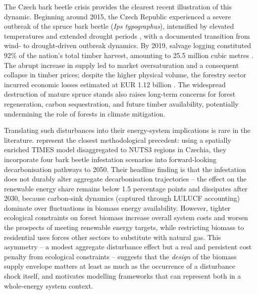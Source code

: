 \documentclass{article}
\begin{document}
The Czech bark beetle crisis provides the clearest recent illustration of this dynamic. Beginning around 2015, the Czech Republic experienced a severe outbreak of the spruce bark beetle (\emph{Ips typographus}), intensified by elevated temperatures and extended drought periods \citep{hlasnyDevastatingOutbreakBark2021}, with a documented transition from wind- to drought-driven outbreak dynamics. By 2019, salvage logging constituted 92\% of the nation's total timber harvest, amounting to 25.5 million cubic metres \citep{simunekNorwaySpruceForest2024}. The abrupt increase in supply led to market oversaturation and a consequent collapse in timber prices; despite the higher physical volume, the forestry sector incurred economic losses estimated at EUR 1.12 billion \citep{tothImpactsCalamityLogging2020}. The widespread destruction of mature spruce stands also raises long-term concerns for forest regeneration, carbon sequestration, and future timber availability, potentially undermining the role of forests in climate mitigation.

Translating such disturbances into their energy-system implications is rare in the literature. \citet{reckaRoleBiomassDecarbonisation2023} represent the closest methodological precedent: using a spatially enriched TIMES model disaggregated to NUTS3 regions in Czechia, they incorporate four bark beetle infestation scenarios into forward-looking decarbonisation pathways to 2050. Their headline finding is that the infestation does not durably alter aggregate decarbonisation trajectories -- the effect on the renewable energy share remains below 1.5 percentage points and dissipates after 2030, because carbon-sink dynamics (captured through LULUCF accounting) dominate over fluctuations in biomass energy availability. However, tighter ecological constraints on forest biomass increase overall system costs and worsen the prospects of meeting renewable energy targets, while restricting biomass to residential uses forces other sectors to substitute with natural gas. This asymmetry -- a modest aggregate disturbance effect but a real and persistent cost penalty from ecological constraints -- suggests that the \emph{design} of the biomass supply envelope matters at least as much as the occurrence of a disturbance shock itself, and motivates modelling frameworks that can represent both in a whole-energy system context.
\end{document}
